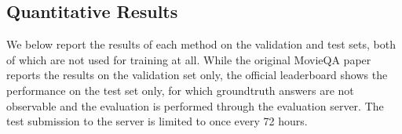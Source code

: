 \documentclass[10pt,twocolumn,letterpaper]{article}
\theoremstyle{nonumberplain}
\begin{document}
\begin{comment}
\hline
\multirow{10}{*}{Scripts ()} 
& \multicolumn{3}{c|}{MEMN2N} & \textbf{42.3} \\
& [20,300,3] & [10,1] & [3,300,1] & 39.4 \\
& [20,300,1] & [10,1] & [3,300,1] & 42.1 \\
& [30,300,1] & [20,1] & [3,300,1] & 38.5 \\
& [40,300,1] & [20,1] & [3,300,1] & 38.5 \\
& [40,300,3] & [20,1] & [3,300,1] & 38.5 \\
& [80,300,3] & [30,1] & [3,300,1] & 39.7 \\
& [100,300,3] & [70,1] & [3,300,1] & 39.2 \\
& [150,300,1] & [100,1] & [3,300,1] & 41.0 \\
& [300,300,1] & [150,1] & [3,300,1] & 42.0 \\
& [400,300,1] & [200,1] & [3,300,1] & 38.5 \\

\hline
\multirow{5}{*}{DVS ()} 
& \multicolumn{3}{c|}{MEMN2N} & 33.0 \\
& [10,300,1] & [5,1] & [3,300,1] & 38.3 \\
& [20,300,1] & [10,1] & [3,300,1] & 39.3 \\ 
& [20,300,3] & [10,1] & [3,300,1] & \textbf{40.0} \\ 
& [20,300,3] & [10,1] & [3,300,3] &  \\ 
& [20,300,3] & [10,1] & [5,300,3] &  \\ 
& [40,300,1] & [20,1] & [3,300,1] & 38.7 \\
 

\end{tabular}
\vspace{6pt}
\caption{The ablation experiments for several key hyperparameters of RWMN. Read stride size is fixed to [1,1] in all experiments.}
\label{tab:rwmn}
\end{center}
\end{table*}
\end{comment}
\subsection{Quantitative Results}
\label{sec:quant_results}

We below report the results of each method on the validation and test sets, both of which are not used for training at all. 
While the original MovieQA paper~\cite{tapaswi2016movieqa} reports the results on the validation set only,
the official leaderboard shows the performance on the test set only, 
for which groundtruth answers are not observable and the evaluation is performed through the evaluation server.
The test submission to the server is limited to once every 72 hours. 
\end{document}
